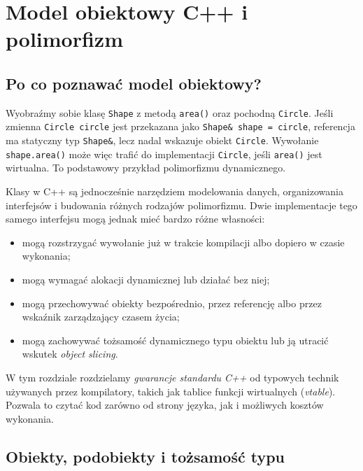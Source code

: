 
\chapter{Model obiektowy C++ i polimorfizm}
\label{chap:cpp-object-model}

\section{Po co poznawać model obiektowy?}

Wyobraźmy sobie klasę \texttt{Shape} z metodą \texttt{area()} oraz
pochodną \texttt{Circle}. Jeśli zmienna \texttt{Circle circle} jest
przekazana jako \texttt{Shape\& shape = circle}, referencja ma
statyczny typ \texttt{Shape\&}, lecz nadal wskazuje obiekt
\texttt{Circle}. Wywołanie \texttt{shape.area()} może więc trafić do
implementacji \texttt{Circle}, jeśli \texttt{area()} jest wirtualna.
To podstawowy przykład polimorfizmu dynamicznego.

Klasy w C++ są jednocześnie narzędziem modelowania danych, organizowania
interfejsów i budowania różnych rodzajów polimorfizmu. Dwie implementacje
tego samego interfejsu mogą jednak mieć bardzo różne własności:
\begin{itemize}
\item mogą rozstrzygać wywołanie już w trakcie kompilacji albo dopiero w
  czasie wykonania;
\item mogą wymagać alokacji dynamicznej lub działać bez niej;
\item mogą przechowywać obiekty bezpośrednio, przez referencję albo przez
  wskaźnik zarządzający czasem życia;
\item mogą zachowywać tożsamość dynamicznego typu obiektu lub ją utracić
  wskutek \emph{object slicing}.
\end{itemize}

W tym rozdziale rozdzielamy \emph{gwarancje standardu C++} od typowych
technik używanych przez kompilatory, takich jak tablice funkcji wirtualnych
(\emph{vtable}). Pozwala to czytać kod zarówno od strony języka, jak i
możliwych kosztów wykonania.

\section{Obiekty, podobiekty i tożsamość typu}
\label{sec:cpp12-subobjects}

